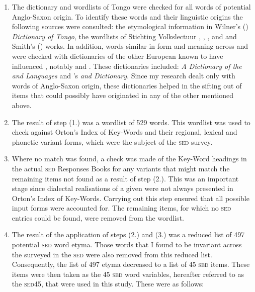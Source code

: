 \begin{enumerate}
\item{ The dictionary and wordlists of  Tongo were checked for all words of potential Anglo-Saxon origin. To identify these words and their linguistic origins the following sources were consulted: the etymological information in Wilner's (\citeyear{Wilner07, Wilner03, Wilner92}) \emph{Dictionary of  Tongo}, the  wordlists of Stichting Volkslectuur \citep{Stichting80}, \citet{Schumann83}, \citet{Fermin69}, and \citet{Herlein18} and Smith's (\citeyear{Smith08, Smith87})  works. In addition, words similar in form and meaning across  and  were checked with dictionaries of the other European  known to have influenced , notably  and . These dictionaries included: \citet{Vieyra60}  \emph{A Dictionary of the  and  Languages} and  \citet{Holtrop23} 's \emph{ and  Dictionary}. Since my research dealt only with words of Anglo-Saxon origin, these dictionaries helped in the sifting out of items that could possibly have originated in any of the other  mentioned above.}
\item{The result of step (1.) was a wordlist of 529 words. This wordlist was used to check against Orton's Index of Key-Words \citep{Orton62} and their regional, lexical and phonetic variant forms, which were the subject of the \textsc{sed} survey.}
\item{Where no match was found, a check was made of the Key-Word headings in the actual \textsc{sed} Responses Books \citep{Orton6271} for any variants that might match the remaining items not found as a result of step (2.). This was an important stage since dialectal realisations of a given  were not always presented in Orton's Index of Key-Words. Carrying out this step ensured that all possible input forms were accounted for. The remaining items, for which no \textsc{sed} entries could be found, were removed from the wordlist.}
\item{The result of the application of steps (2.) and (3.) was a reduced list of 497 potential \textsc{sed} word etyma. Those words that I found to be invariant across the   surveyed in the \textsc{sed} were also removed from this reduced list. Consequently, the list of 497  etyma decreased to a list of 45 \textsc{sed} items. These items were then taken as the 45 \textsc{sed} word variables, hereafter referred to as the \textsc{sed45}, that were used in this study. These were as follows:

}
\end{enumerate}
